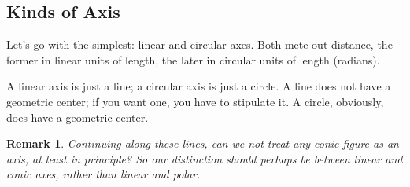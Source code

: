 \documentclass[12pt]{tufte-handout}
\numberwithin{equation}{subsection}
\numberwithin{equation}{subsection}
\newtheorem{remark}{Remark}
\begin{document}
  \subsection{Kinds of Axis}

  Let's go with the simplest: linear and circular axes.  Both mete
  out distance, the former in linear units of length, the later in
  circular units of length (radians).

  A linear axis is just a line; a circular axis is just a circle.  A
  line does not have a geometric center; if you want one, you have
  to stipulate it.  A circle, obviously, does have a geometric
  center.

  \begin{remark}
    Continuing along these lines, can we not treat any conic figure
    as an axis, at least in principle?  So our distinction should
    perhaps be between linear and conic axes, rather than linear and
    polar.
  \end{remark}
\end{document}
